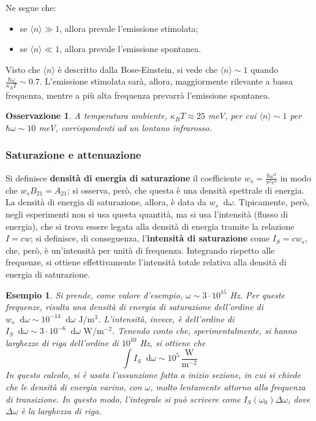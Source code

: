 \documentclass[11pt, a4paper]{scrartcl}
\theoremstyle{style}
\newtheorem{esempio}{Esempio}[section]
\newtheorem{osservazione}{Osservazione}[section]
\newcommand{\dd}{\mathop{}\!\mathrm{d}}
\numberwithin{equation}{subsection}
\begin{document}
Ne segue che:
\begin{itemize}
	\item  se $\langle n \rangle\gg 1$, allora prevale l'emissione stimolata;
	\item se $\langle n \rangle \ll 1$, allora prevale l'emissione spontanea.
\end{itemize}
Visto che $\langle n \rangle$ \`e descritto dalla Bose-Einstein, si vede che $\langle n \rangle \sim 1$ quando $\frac{\hbar \omega }{\kappa _B T} \sim 0.7$. 
L'emissione stimolata sar\`a, allora, maggiormente rilevante a bassa frequenza, mentre a pi\`u alta frequenza prevarr\`a l'emissione spontanea.
\begin{osservazione}
A temperatura ambiente, $\kappa _B T \approx 25$ meV, per cui $\langle n \rangle \sim 1$ per $\hbar \omega \sim 10$ meV, corrispondenti ad un lontano infrarosso. 
\end{osservazione}

\subsubsection{Saturazione e attenuazione}

Si definisce \textbf{densit\`a di energia di saturazione} il coefficiente $w_s = \frac{\hbar \omega ^3}{\pi^2 c^3}$ in modo che $w_s B_{21} = A_{21}$; si osserva, per\`o, che questa \`e una densit\`a spettrale di energia.
La densit\`a di energia di saturazione, allora, \`e data da $w_s \dd \omega $.
	Tipicamente, per\`o, negli esperimenti non si usa questa quantit\`a, ma si usa l'intensit\`a (flusso di energia), che si trova essere legata alla densit\`a di energia tramite la relazione $I = c w$; si definisce, di conseguenza, l'\textbf{intensit\`a di saturazione} come $I_S = c w_s$, che, per\`o, \`e un'intensit\`a per unit\`a di frequenza.
	Integrando rispetto alle frequenze, si ottiene effettivamente l'intensit\`a totale relativa alla densit\`a di energia di saturazione.

\begin{esempio}
Si prende, come valore d'esempio, $\omega \sim 3 \cdot 10^{15}$ Hz.
Per queste frequenze, risulta una densit\`a di energia di saturazione dell'ordine di $w_s \dd \omega  \sim 10^{-14} \dd \omega \text{ J}/\text{m}^3$.
L'intensit\`a, invece, \`e dell'ordine di $I_S \dd \omega  \sim 3 \cdot 10^{-6} \dd \omega  \text{ W}/\text{m}^{-2}$.
Tenendo conto che, sperimentalmente, si hanno larghezze di riga dell'ordine di $10 ^{10}$ Hz, si ottiene che
	\[
	\int I_S \dd \omega \sim 10^{5}\, \frac{\text{W}}{\text{m}^{-2}}
	\] 
	In questo calcolo, si \`e usata l'assunzione fatta a inizio sezione, in cui si chiede che le densit\`a di energia varino, con $\omega $, molto lentamente attorno alla frequenza di transizione.
	In questo modo, l'integrale si pu\`o scrivere come $I_S(\omega _0) \Delta \omega $, dove $\Delta \omega $ \`e la larghezza di riga.
\end{esempio}
\end{document}
